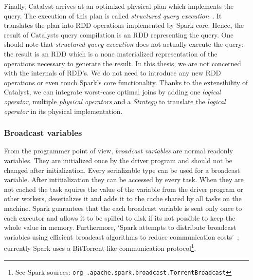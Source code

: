 Finally, Catalyst arrives at an optimized physical plan which implements the query.
The execution of this plan is called
\textit{structured query execution}~\cite{spark-internals-structured-query-execution}.
It translates the plan into RDD operations implemented by Spark core.
Hence, the result of Catalysts query compilation is an RDD representing the query.
One should note that \textit{structured query execution} does not actually execute the query: the result is an RDD which is a none
materialized representation of the operations necessary to generate the result.
In this thesis, we are not concerned with the internals of RDD's.
We do not need to introduce any new RDD operations or even touch Spark's core functionality.
Thanks to the extensibility of Catalyst, we can integrate worst-case optimal joins by adding one \textit{logical operator}, multiple
\textit{physical operators} and a \textit{Strategy} to translate the \textit{logical operator} in
its physical implementation.

\subsubsection{Broadcast variables} \label{subsubsec:broadcast-variables}
From the programmer point of view, \textit{broadcast variables} are normal readonly variables.
They are initialized once by the driver program and should not be changed after initialization.
Every serializable type can be used for a broadcast variable.
After intitialization they can be accessed by every task.
When they are not cached the task aquires the value of the variable from the driver program or other workers, deserializes it and
adds it to the cache shared by all tasks on the machine.
Spark guarantees that the each broadcast variable is sent only once to each executor and allows it to be spilled to disk if its not
possible to keep the whole value in memory.
Furthermore, `Spark attempts to distribute broadcast variables using efficient broadcast algorithms to reduce communication
costs'~\cite{rdd-programming-guide}; currently Spark uses a BitTorrent-like communication protocol\footnote{See Spark sources: \texttt{org
.apache.spark.broadcast.TorrentBroadcast}}.

